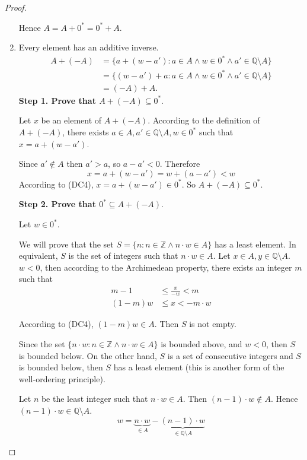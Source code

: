 \begin{proof}
\begin{enumerate}[label = (F\arabic*)]
              Hence $A = A + {0}^{*} = {0}^{*} + A$.
        \item Every element has an additive inverse.
              \begin{align*}
                  A + (-A) & = \{ a + (w - a') : a\in A\land w\in {0}^{*}\land a'\in\mathbb{Q}\setminus A \} \\
                           & = \{ (w - a') + a : a\in A\land w\in {0}^{*}\land a'\in\mathbb{Q}\setminus A \} \\
                           & = (-A) + A.
              \end{align*}
              \textbf{Step 1. Prove that $A + (-A)\subseteq {0}^{*}$}.

              Let $x$ be an element of $A + (-A)$. According to the definition of $A + (-A)$, there exists $a\in A, a'\in \mathbb{Q}\setminus A, w\in {0}^{*}$ such that $x = a + (w - a')$.

              Since $a'\notin A$ then $a' > a$, so $a - a' < 0$. Therefore
              \[
                  x = a + (w - a') = w + (a - a') < w
              \]
              According to (DC4), $x = a + (w - a')\in {0}^{*}$. So $A + (-A) \subseteq {0}^{*}$.
              \bigskip

              \textbf{Step 2. Prove that ${0}^{*}\subseteq A + (-A)$}.

              Let $w\in {0}^{*}$.

              We will prove that the set $S = \{ n : n\in\mathbb{Z} \land n\cdot w\in A \}$ has a least element. In equivalent, $S$ is the set of integers such that $n\cdot w\in A$.
              Let $x\in A, y\in\mathbb{Q}\setminus A$. $w < 0$, then according to the Archimedean property, there exists an integer $m$ such that
              \begin{align*}
                  m - 1    & \le \frac{x}{-w} < m \\
                  (1 - m)w & \le x < -m\cdot w
              \end{align*}

              According to (DC4), $(1 - m)w\in A$. Then $S$ is not empty.

              Since the set $\{ n\cdot w : n\in\mathbb{Z}\land n\cdot w\in A \}$ is bounded above, and $w < 0$, then $S$ is bounded below. On the other hand, $S$ is a set of consecutive integers and $S$ is bounded below, then $S$ has a least element (this is another form of the well-ordering principle).

              Let $n$ be the least integer such that $n\cdot w\in A$. Then $(n - 1)\cdot w\notin A$. Hence $(n - 1)\cdot w\in\mathbb{Q}\setminus A$.
              \[
                  w = \underbrace{n\cdot w}_{\in A} - \underbrace{(n - 1)\cdot w}_{\in\mathbb{Q}\setminus A}
              \]


\end{enumerate}
\end{proof}
